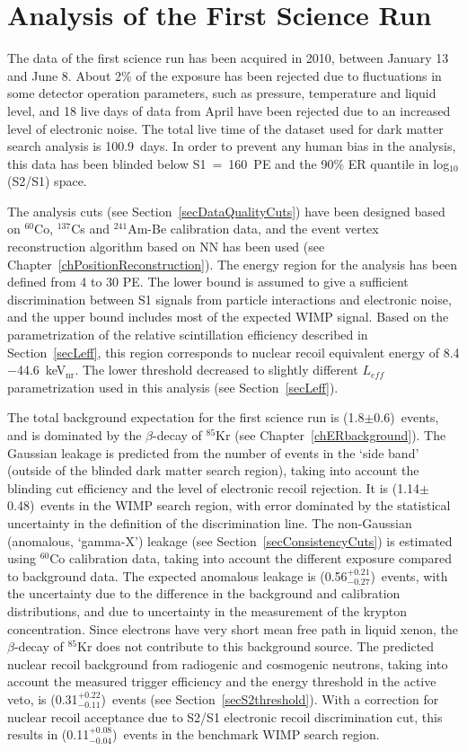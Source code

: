 \section{Analysis of the First Science Run}
\label{secRun08}

The data of the first science run has been acquired in 2010, between January 13 and June 8. About 2\% of the exposure has been rejected due to fluctuations in some detector operation parameters, such as pressure, temperature and liquid level, and 18 live days of data from April have been rejected due to an increased level of electronic noise. The total live time of the dataset used for dark matter search analysis is 100.9~days. In order to prevent any human bias in the analysis, this data has been blinded below S1~=~160~PE and the 90\% ER quantile in log$_{10}$(S2/S1) space. 

The analysis cuts (see Section~\ref{secDataQualityCuts}) have been designed based on $^{60}$Co, $^{137}$Cs and $^{241}$Am-Be calibration data, and the event vertex reconstruction algorithm based on NN has been used (see Chapter~\ref{chPositionReconstruction}). 
The energy region for the analysis has been defined from 4 to 30 PE. The lower bound is assumed to give a sufficient discrimination between S1 signals from particle interactions and electronic noise, and the upper bound includes most of the expected WIMP signal. 
Based on the parametrization of the relative scintillation efficiency described in Section~\ref{secLeff}, this region corresponds to nuclear recoil equivalent energy of 8.4$-$44.6~keV$_{\mathrm{nr}}$. The lower threshold decreased to slightly different $L_{eff}$ parametrization used in this analysis (see Section~\ref{secLeff}).

The total background expectation for the first science run is (1.8$\pm$0.6)~events, and is dominated by the $\beta$-decay of $^{85}$Kr (see Chapter~\ref{chERbackground}). The Gaussian leakage is predicted from the number of events in the `side band' (outside of the blinded dark matter search region), taking into account the blinding cut efficiency and the level of electronic recoil rejection. It is (1.14$\pm$0.48)~events in the WIMP search region, with error dominated by the statistical uncertainty in the definition of the discrimination line. 
The non-Gaussian (anomalous, `gamma-X') leakage (see Section~\ref{secConsistencyCuts}) is estimated using $^{60}$Co calibration data, taking into account the different exposure compared to background data. 
The expected anomalous leakage is (0.56$^{+0.21}_{-0.27}$)~events, with the uncertainty due to the difference in the background and calibration distributions, and due to uncertainty in the measurement of the krypton concentration. Since electrons have very short mean free path in liquid xenon, the $\beta$-decay of $^{85}$Kr does not contribute to this background source. 
The predicted nuclear recoil background from radiogenic and cosmogenic neutrons, taking into account the measured trigger efficiency and the energy threshold in the active veto, is (0.31$^{+0.22}_{-0.11}$)~events (see Section~\ref{secS2threshold}). With a correction for nuclear recoil acceptance due to S2/S1 electronic recoil discrimination cut, this results in (0.11$^{+0.08}_{-0.04}$)~events in the benchmark WIMP search region.
 
